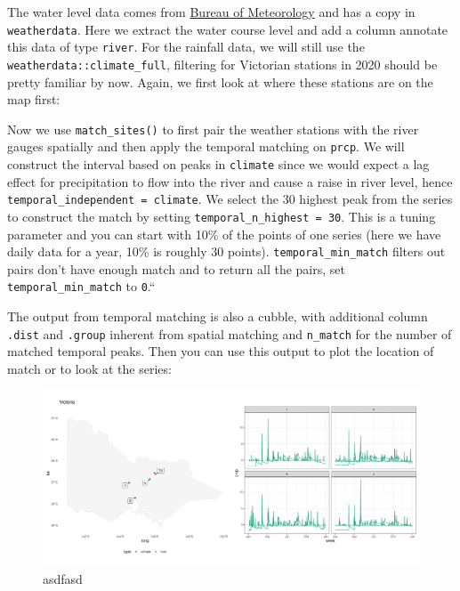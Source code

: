 \documentclass[
]{jss}
\begin{document}
The water level data comes from
\href{http://www.bom.gov.au/metadata/catalogue/19115/ANZCW0503900528?template=full}{Bureau
of Meteorology} and has a copy in \texttt{weatherdata}. Here we extract
the water course level and add a column annotate this data of type
\texttt{river}. For the rainfall data, we will still use the
\texttt{weatherdata::climate\_full}, filtering for Victorian stations in
2020 should be pretty familiar by now. Again, we first look at where
these stations are on the map first:

Now we use \texttt{match\_sites()} to first pair the weather stations
with the river gauges spatially and then apply the temporal matching on
\texttt{prcp}. We will construct the interval based on peaks in
\texttt{climate} since we would expect a lag effect for precipitation to
flow into the river and cause a raise in river level, hence
\texttt{temporal\_independent\ =\ climate}. We select the 30 highest
peak from the series to construct the match by setting
\texttt{temporal\_n\_highest\ =\ 30}. This is a tuning parameter and you
can start with 10\% of the points of one series (here we have daily data
for a year, 10\% is roughly 30 points). \texttt{temporal\_min\_match}
filters out pairs don't have enough match and to return all the pairs,
set \texttt{temporal\_min\_match} to \texttt{0}.``

The output from temporal matching is also a cubble, with additional
column \texttt{.dist} and \texttt{.group} inherent from spatial matching
and \texttt{n\_match} for the number of matched temporal peaks. Then you
can use this output to plot the location of match or to look at the
series:

\begin{CodeChunk}
\begin{figure}

{\centering \includegraphics[width=1\linewidth,height=0.3\textheight]{figures/matching} 

}

\caption[asdfasd]{asdfasd}\label{fig:matching}
\end{figure}
\end{CodeChunk}
\end{document}
